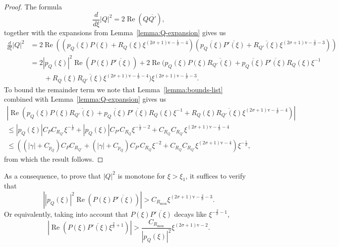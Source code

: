 \documentclass[11pt]{article}
\DeclareMathOperator{\real}{Re}
\newcommand{\conj}[1]{\overline{#1}}
\newcommand{\normv}{\mathrm{v}}
\begin{document}
\begin{proof}
  The formula
  \begin{equation*}
    \frac{d}{d\xi}|Q|^{2} = 2\real(Q\conj{Q'}),
  \end{equation*}
  together with the expansions from Lemma~\ref{lemma:Q-expansion}
  gives us
  \begin{equation*}
    \begin{split}
      \frac{d}{d\xi}|Q|^{2}
      &= 2\real\left(
        \left(
        p_{Q}(\xi)P(\xi)
        + R_{Q}(\xi)\xi^{(2\sigma + 1)\normv - \frac{1}{\sigma} - 4}
        \right)
        \left(
        \conj{p_{Q}(\xi)}\conj{P'(\xi)}
        + \conj{R_{Q'}(\xi)}\xi^{(2\sigma + 1)\normv - \frac{1}{\sigma} - 3}
        \right)
        \right)\\
      &= 2|p_{Q}(\xi)|^{2}\real\left(P(\xi)\conj{P'(\xi)}\right)
        + 2\real\Big(
        p_{Q}(\xi)P(\xi)\conj{R_{Q'}(\xi)}
      + \conj{p_{Q}(\xi)}\conj{P'(\xi)}R_{Q}(\xi)\xi^{-1}\\
      &\qquad+ R_{Q}(\xi)\conj{R_{Q'}(\xi)}\xi^{(2\sigma + 1)\normv - \frac{1}{\sigma} - 4}
        \Big)\xi^{(2\sigma + 1)\normv - \frac{1}{\sigma} - 3}.
    \end{split}
  \end{equation*}
  To bound the remainder term we note that
  Lemma~\ref{lemma:bounds-list} combined with
  Lemma~\ref{lemma:Q-expansion} gives us
  \begin{multline*}
    \left|\real\left(
        p_{Q}(\xi)P(\xi)\conj{R_{Q'}(\xi)}
        + \conj{p_{Q}(\xi)}\conj{P'(\xi)}R_{Q}(\xi)\xi^{-1}
        + R_{Q}(\xi)\conj{R_{Q'}(\xi)}\xi^{(2\sigma + 1)\normv - \frac{1}{\sigma} - 4}
      \right)\right|\\
    \leq |p_{Q}(\xi)|C_{P}C_{R_{Q'}}\xi^{-\frac{1}{\sigma}}
    + |p_{Q}(\xi)|C_{P'}C_{R_{Q}}\xi^{-\frac{1}{\sigma} - 2}
    + C_{R_{Q}}C_{R_{Q'}}\xi^{(2\sigma + 1)\normv - \frac{1}{\sigma} - 4}\\
    \leq \left(
      (|\gamma| + C_{p_{Q}})C_{P}C_{R_{Q'}}
      + (|\gamma| + C_{p_{Q}})C_{P'}C_{R_{Q}}\xi^{-2}
      + C_{R_{Q}}C_{R_{Q'}}\xi^{(2\sigma + 1)\normv - 4}
    \right)\xi^{-\frac{1}{\sigma}},
  \end{multline*}
  from which the result follows.
\end{proof}

As a consequence, to prove that \(|Q|^{2}\) is monotone for
\(\xi > \xi_{1}\), it suffices to verify that
\begin{equation*}
  \left||p_{Q}(\xi)|^{2}\real\left(P(\xi)\conj{P'(\xi)}\right)\right|
  > C_{R_{\mathrm{mon}}}\xi^{(2\sigma + 1)\normv - \frac{2}{\sigma} - 3}.
\end{equation*}
Or equivalently, taking into account that \(P(\xi)\conj{P'(\xi)}\)
decays like \(\xi^{-\frac{2}{\sigma} - 1}\),
\begin{equation}\label{eq:monotone-condition}
  \left|\real\left(P(\xi)\conj{P'(\xi)}\xi^{\frac{2}{\sigma} + 1}\right)\right|
  > \frac{C_{R_{\mathrm{mon}}}}{|p_{Q}(\xi)|^{2}}\xi^{(2\sigma + 1)\normv - 2}.
\end{equation}
\end{document}
